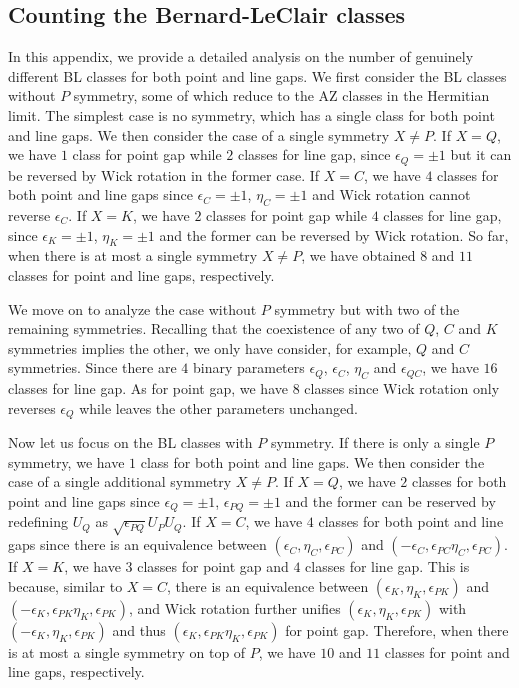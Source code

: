 \documentclass{tADP2e}
\theoremstyle{plain}
\theoremstyle{plain}
\theoremstyle{definition}
\begin{document}
\begin{appendices}
\subsection{Counting the Bernard-LeClair classes}\label{Sec:countBL}
In this appendix, we provide a detailed analysis on the number of genuinely different BL classes for both point and line gaps. We first consider the BL classes without $P$ symmetry, some of which reduce to the AZ classes in the Hermitian limit. The simplest case is no symmetry, which has a single class for both point and line gaps. We then consider the case of a single symmetry $X\neq P$. If $X=Q$, we have $1$ class for point gap while $2$ classes for line gap, since $\epsilon_Q=\pm1$ but it can be reversed by Wick rotation in the former case. If $X=C$, we have $4$ classes for both point and line gaps since $\epsilon_C=\pm1$, $\eta_C=\pm1$ and Wick rotation cannot reverse $\epsilon_C$. If $X=K$, we have $2$ classes for point gap while $4$ classes for line gap, since $\epsilon_K=\pm1$, $\eta_K=\pm1$ and the former can be reversed by Wick rotation. So far, when there is at most a single symmetry $X\neq P$, we have obtained $8$ and $11$ classes for point and line gaps, respectively.

  
We move on to analyze the case without $P$ symmetry but with two of the remaining symmetries. Recalling that the coexistence of any two of $Q$, $C$ and $K$ symmetries implies the other, we only have consider, for example, $Q$ and $C$ symmetries. Since there are $4$ binary parameters $\epsilon_Q$, $\epsilon_C$, $\eta_C$ and $\epsilon_{QC}$, we have $16$ classes for line gap. As for point gap, we have $8$ classes since Wick rotation only reverses $\epsilon_Q$ while leaves the other parameters unchanged.


Now let us focus on the BL classes with $P$ symmetry. If there is only a single $P$ symmetry, we have $1$ class for both point and line gaps. We then consider the case of a single additional symmetry $X\neq P$. If $X=Q$, we have $2$ classes for both point and line gaps since $\epsilon_Q=\pm1$, $\epsilon_{PQ}=\pm1$ and the former can be reserved by redefining $U_Q$ as $\sqrt{\epsilon_{PQ}}U_PU_Q$. If $X=C$, we have $4$ classes for both point and line gaps since there is an equivalence between $(\epsilon_C,\eta_C,\epsilon_{PC})$ and $(-\epsilon_C,\epsilon_{PC}\eta_C,\epsilon_{PC})$. If $X=K$, we have $3$ classes for point gap and $4$ classes for line gap. This is because, similar to $X=C$, there is an equivalence between $(\epsilon_K,\eta_K,\epsilon_{PK})$ and $(-\epsilon_K,\epsilon_{PK}\eta_K,\epsilon_{PK})$, and Wick rotation further unifies $(\epsilon_K,\eta_K,\epsilon_{PK})$ with $(-\epsilon_K,\eta_K,\epsilon_{PK})$ and thus $(\epsilon_K,\epsilon_{PK}\eta_K,\epsilon_{PK})$ for point gap. Therefore, when there is at most a single symmetry on top of $P$, we have $10$ and $11$ classes for point and line gaps, respectively.


\end{appendices}
\end{document}
